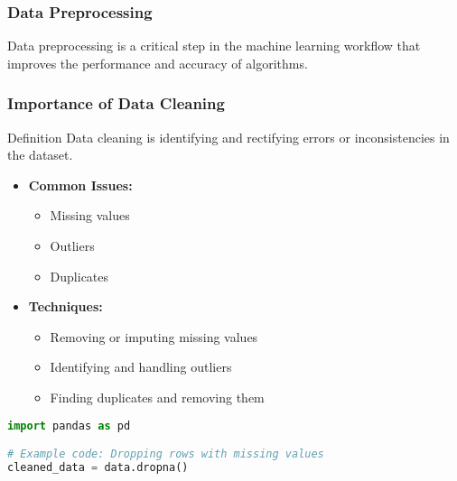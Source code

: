 \documentclass[aspectratio=169]{beamer}
\begin{document}
\begin{frame}[fragile]
    \frametitle{Data Preprocessing}
    Data preprocessing is a critical step in the machine learning workflow that improves the performance and accuracy of algorithms.
\end{frame}

\begin{frame}[fragile]
    \frametitle{Importance of Data Cleaning}
    \begin{block}{Definition}
        Data cleaning is identifying and rectifying errors or inconsistencies in the dataset.
    \end{block}

    \begin{itemize}
        \item \textbf{Common Issues:}
        \begin{itemize}
            \item Missing values
            \item Outliers
            \item Duplicates
        \end{itemize}
        
        \item \textbf{Techniques:}
        \begin{itemize}
            \item Removing or imputing missing values 
            \item Identifying and handling outliers
            \item Finding duplicates and removing them
        \end{itemize}
    \end{itemize}
    
    \begin{lstlisting}[language=Python]
import pandas as pd

# Example code: Dropping rows with missing values
cleaned_data = data.dropna()
    \end{lstlisting}
\end{frame}
\end{document}
